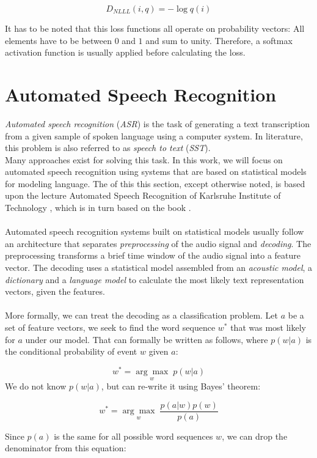 \[
D_{NLLL}(i, q) = -\log q(i)
\]

It has to be noted that this loss functions all operate on probability vectors: All elements have to be between $0$ and $1$ and sum to unity. Therefore, a softmax activation function is usually applied before calculating the loss. 
\section{Automated Speech Recognition}
\label{ch:HMM_ASR}
\textit{Automated speech recognition} (\textit{ASR}) is the task of generating a text transcription from a given sample of spoken language using a computer system. In literature, this problem is also referred to as \textit{speech to text} (\textit{SST}). \\
Many approaches exist for solving this task. In this work, we will focus on automated speech recognition using systems that are based on statistical models for modeling language. The of this this section, except otherwise noted, is based upon the lecture Automated Speech Recognition of Karlsruhe Institute of Technology \cite{kitasr2018stueker}, which is in turn based on the book \cite{schukat1995automatische}. \\ \\
Automated speech recognition systems built on statistical models usually follow an architecture that separates \textit{preprocessing} of the audio signal and \textit{decoding}. The preprocessing transforms a brief time window of the audio signal into a feature vector. The decoding uses a statistical model assembled from an \textit{acoustic model}, a \textit{dictionary} and a \textit{language model} to calculate the most likely text representation vectors, given the features. \\ \\

More formally, we can treat the decoding as a classification problem. Let $a$ be a set of feature vectors, we seek to find the word sequence $w^*$ that was most likely for $a$ under our model. That can formally be written as follows, where $p(w|a)$ is the conditional probability of event $w$ given $a$:

\[
w^* = \underset{w}{\arg \max} \; p(w|a)
\] 
We do not know $p(w|a)$, but can re-write it using Bayes' theorem:

\[
w^* = \underset{w}{\arg \max} \; \frac{p(a|w) p(w)}{p(a)}
\]

Since $p(a)$ is the same for all possible word sequences $w$, we can drop the denominator from this equation:

